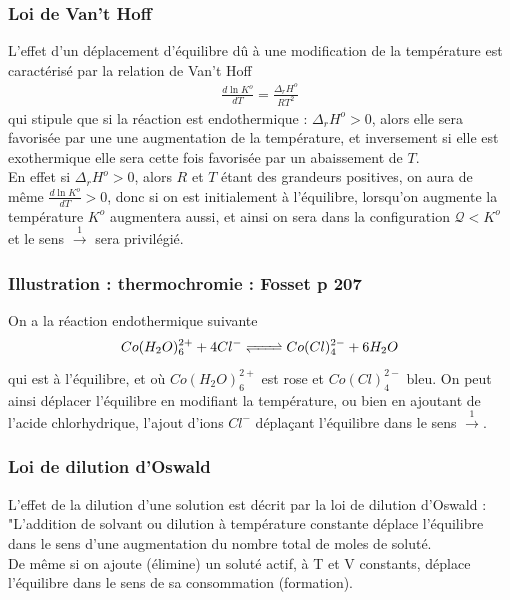 \documentclass[12pt,prb,aps,epsf]{report}
\begin{document}
\subsubsection{Loi de Van't Hoff}
L'effet d'un déplacement d'équilibre dû à une modification de la température est caractérisé par la relation de Van't Hoff 
\begin{eqnarray}
\frac{d\ln K^o}{dT} = \frac{\Delta_r H^o}{RT^2}
\end{eqnarray}
qui stipule que si la réaction est endothermique : $\Delta_r H^o>0$, alors elle sera favorisée par une une augmentation de la température, et inversement si elle est exothermique elle sera cette fois favorisée par un abaissement de $T$.\\
En effet si  $\Delta_r H^o>0$, alors $R$ et $T$ étant des grandeurs positives, on aura de même $\frac{d\ln K^o}{dT} >0$, donc si on est initialement à l'équilibre, lorsqu'on augmente la température $K^o$ augmentera aussi, et ainsi on sera dans la configuration $\mathcal{Q} < K^o$ et le sens $\stackrel{1}\longrightarrow$ sera privilégié.

\subsubsection{Illustration : thermochromie : Fosset p 207}
On a la réaction endothermique suivante
\begin{eqnarray}
Co(H_2O)_6^{2+} + 4Cl^- \xrightleftharpoons{\hspace{0.7cm}} Co(Cl)^{2-}_4 + 6H_2O
\end{eqnarray}
qui est à l'équilibre, et où $Co(H_2O)_6^{2+}$ est rose et $Co(Cl)^{2-}_4$ bleu. On peut ainsi déplacer l'équilibre en modifiant la température, ou bien en ajoutant de l'acide chlorhydrique, l'ajout d'ions $Cl^-$ déplaçant l'équilibre dans le sens $\stackrel{1}\longrightarrow$.

\subsubsection{Loi de dilution d'Oswald}
L'effet de la dilution d'une solution est décrit par la loi de dilution d'Oswald :\\
"L'addition de solvant ou dilution à température constante déplace l'équilibre dans le sens d'une augmentation du nombre total de moles de soluté.\\

De même si on ajoute (élimine) un soluté actif, à T et V constants, déplace l'équilibre dans le sens de sa consommation (formation).\\
\end{document}
